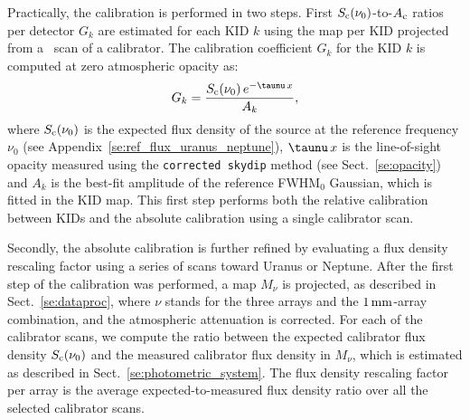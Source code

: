 {\lp Practically, the calibration is performed in two steps. First
$S_{\rm{c}}(\nu_{0})$-to-$A_{\rm{c}}$ ratios per detector $G_k$
are estimated for each KID $k$ using the map per KID projected from
a \bm\ scan of a calibrator. The calibration coefficient $G_k$
for the KID $k$ is computed at zero atmospheric opacity as:
\begin{equation}
  G_k = \frac{S_{\rm{c}}(\nu_0)\, e^{-\taunu\,x}}{A_k},
  \label{eq:kid_gain}
\end{equation}
where $S_{\rm{c}}(\nu_0)$ is the expected flux density of the source at
the reference frequency $\nu_0$ (see
Appendix~\ref{se:ref_flux_uranus_neptune}), $\taunu\, x$ is the
line-of-sight opacity measured using the {\tt corrected skydip} method
(see Sect.~\ref{se:opacity}) and $A_k$ is the best-fit
amplitude of the reference FWHM$_0$ Gaussian, which is fitted in the
KID map. %
This first step performs both the relative calibration between KIDs and the absolute
calibration using a single calibrator scan.

Secondly, the absolute calibration is further refined by evaluating a
flux density rescaling factor using a series of scans toward
Uranus or Neptune. After the first step of the calibration was
performed, a map $M_\nu$ is projected, as
described in Sect.~\ref{se:dataproc}, where $\nu$ stands for the three
arrays and the $1\,\rm{mm}$-array combination, and the atmospheric attenuation
is corrected. For each of the calibrator scans, we
compute the ratio between the expected calibrator flux density
$S_{\rm{c}}(\nu_{0})$ and the measured calibrator flux density in $M_\nu$, which
is estimated as described in Sect.~\ref{se:photometric_system}. The
flux density rescaling factor per array is the average
expected-to-measured flux density ratio over all the selected calibrator scans.} 

%

